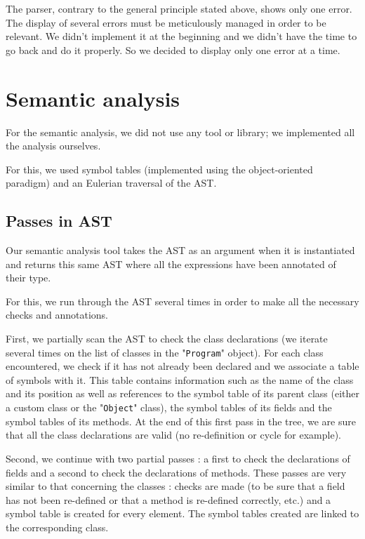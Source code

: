 \documentclass[a4paper, 12pt]{article}
\begin{document}
    The parser, contrary to the general principle stated above, shows only one error. The display of several errors must be meticulously managed in order to be relevant. We didn't implement it at the beginning and we didn't have the time to go back and do it properly. So we decided to display only one error at a time.
    
    
    \section{Semantic analysis}
    
    For the semantic analysis, we did not use any tool or library; we implemented all the analysis ourselves.
    
    For this, we used symbol tables (implemented using the object-oriented paradigm) and an Eulerian traversal of the AST.
    
    \subsection{Passes in AST}
    
    Our semantic analysis tool takes the AST as an argument when it is instantiated and returns this same AST where all the expressions have been annotated of their type.
    
    For this, we run through the AST several times in order to make all the necessary checks and annotations.
    
    First, we partially scan the AST to check the class declarations (we iterate several times on the list of classes in the "\texttt{Program}" object). For each class encountered, we check if it has not already been declared and we associate a table of symbols with it. This table contains information such as the name of the class and its position as well as references to the symbol table of its parent class (either a custom class or the "\texttt{Object}" class), the symbol tables of its fields and the symbol tables of its methods. At the end of this first pass in the tree, we are sure that all the class declarations are valid (no re-definition or cycle for example).
    
    Second, we continue with two partial passes : a first to check the declarations of fields and a second to check the declarations of methods. These passes are very similar to that concerning the classes : checks are made (to be sure that a field has not been re-defined or that a method is re-defined correctly, etc.) and a symbol table is created for every element. The symbol tables created are linked to the corresponding class.
    
\end{document}

